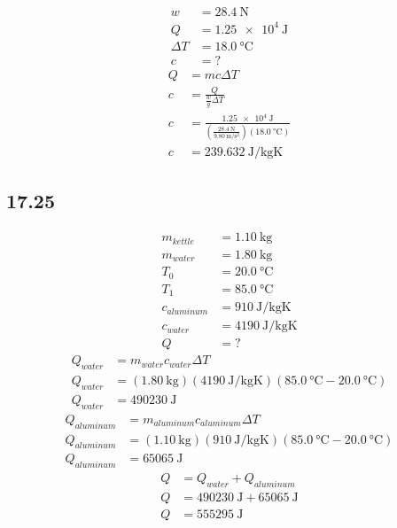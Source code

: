 \documentclass{article}
\begin{document}
\begin{align*}
	w & = \SI{28.4}{\newton} \\
	Q & = \SI{1.25e4}{\joule} \\
	\Delta T & = \SI{18.0}{\celsius} \\
	c & = ?
\end{align*}
\begin{align*}
	Q & = mc\Delta T \\
	c & = \frac{ Q }{ \frac{ w }{ g }\Delta T } \\
	c & = \frac{ \SI{1.25e4}{\joule} }{ \left( \frac{ \SI{28.4}{\newton} }{ \SI{9.80}{\meter \per \second \squared} } \right) (\SI{18.0}{\celsius}) } \\
	c & = \SI{239.632}{\joule \per \kilogram \kelvin}
\end{align*}

\subsection{17.25}

\begin{align*}
	m_{kettle} & = \SI{1.10}{\kilogram} \\
	m_{water} & = \SI{1.80}{\kilogram} \\
	T_0 & = \SI{20.0}{\celsius} \\
	T_1 & = \SI{85.0}{\celsius} \\
	c_{aluminum} & = \SI{910}{\joule \per \kilogram \kelvin} \\
	c_{water} & = \SI{4190}{\joule \per \kilogram \kelvin} \\
	Q & = ?
\end{align*}
\begin{align*}
	Q_{water} & = m_{water}c_{water}\Delta T \\
	Q_{water} & = (\SI{1.80}{\kilogram})(\SI{4190}{\joule \per \kilogram \kelvin})(\SI{85.0}{\celsius} - \SI{20.0}{\celsius}) \\
	Q_{water} & = \SI{490230}{\joule}
\end{align*}
\begin{align*}
	Q_{aluminum} & = m_{aluminum}c_{aluminum}\Delta T \\
	Q_{aluminum} & = (\SI{1.10}{\kilogram})(\SI{910}{\joule \per \kilogram \kelvin})(\SI{85.0}{\celsius} - \SI{20.0}{\celsius}) \\
	Q_{aluminum} & = \SI{65065}{\joule}
\end{align*}
\begin{align*}
	Q & = Q_{water} + Q_{aluminum} \\
	Q & = \SI{490230}{\joule} + \SI{65065}{\joule} \\
	Q & = \SI{555295}{\joule}
\end{align*}
\end{document}
